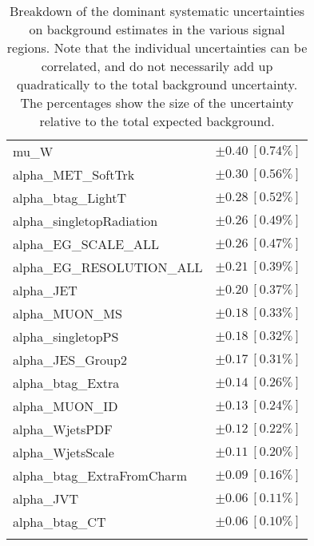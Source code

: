 \begin{table}
\begin{center}
\begin{tabular*}{\textwidth}{@{\extracolsep{\fill}}lc}
mu\_W         & $\pm 0.40\ [0.74\%] $       \\
alpha\_MET\_SoftTrk         & $\pm 0.30\ [0.56\%] $       \\
alpha\_btag\_LightT         & $\pm 0.28\ [0.52\%] $       \\
alpha\_singletopRadiation         & $\pm 0.26\ [0.49\%] $       \\
alpha\_EG\_SCALE\_ALL         & $\pm 0.26\ [0.47\%] $       \\
alpha\_EG\_RESOLUTION\_ALL         & $\pm 0.21\ [0.39\%] $       \\
alpha\_JET         & $\pm 0.20\ [0.37\%] $       \\
alpha\_MUON\_MS         & $\pm 0.18\ [0.33\%] $       \\
alpha\_singletopPS         & $\pm 0.18\ [0.32\%] $       \\
alpha\_JES\_Group2         & $\pm 0.17\ [0.31\%] $       \\
alpha\_btag\_Extra         & $\pm 0.14\ [0.26\%] $       \\
alpha\_MUON\_ID         & $\pm 0.13\ [0.24\%] $       \\
alpha\_WjetsPDF         & $\pm 0.12\ [0.22\%] $       \\
alpha\_WjetsScale         & $\pm 0.11\ [0.20\%] $       \\
alpha\_btag\_ExtraFromCharm         & $\pm 0.09\ [0.16\%] $       \\
alpha\_JVT         & $\pm 0.06\ [0.11\%] $       \\
alpha\_btag\_CT         & $\pm 0.06\ [0.10\%] $       \\
\noalign{\smallskip}\hline\noalign{\smallskip}
\end{tabular*}
\end{center}
\caption[Breakdown of uncertainty on background estimates]{
Breakdown of the dominant systematic uncertainties on background estimates in the various signal regions.
Note that the individual uncertainties can be correlated, and do not necessarily add up quadratically to 
the total background uncertainty. The percentages show the size of the uncertainty relative to the total expected background.
\label{table.results.bkgestimate.uncertainties.VRtt2onEM_cuts}}
\end{table}
%